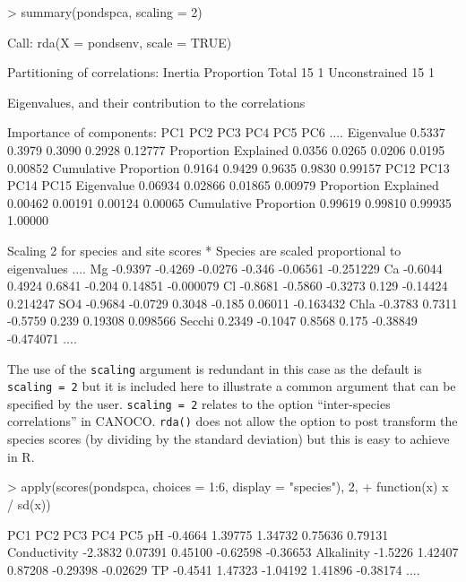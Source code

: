 \documentclass[a4paper,10pt]{article}
\newcommand{\rda}{\texttt{rda()}\xspace}
\newcommand{\R}{\textsf{R}\xspace}
\begin{document}
\begin{Schunk}
\begin{Sinput}
> summary(pondspca, scaling = 2)
\end{Sinput}
\end{Schunk}
\begin{Schunk}
\begin{Soutput}
Call:
rda(X = pondsenv, scale = TRUE) 

Partitioning of correlations:
              Inertia Proportion
Total              15          1
Unconstrained      15          1

Eigenvalues, and their contribution to the correlations 

Importance of components:
                        PC1   PC2   PC3    PC4    PC5    PC6
....
Eigenvalue            0.5337 0.3979 0.3090 0.2928 0.12777
Proportion Explained  0.0356 0.0265 0.0206 0.0195 0.00852
Cumulative Proportion 0.9164 0.9429 0.9635 0.9830 0.99157
                         PC12    PC13    PC14    PC15
Eigenvalue            0.06934 0.02866 0.01865 0.00979
Proportion Explained  0.00462 0.00191 0.00124 0.00065
Cumulative Proportion 0.99619 0.99810 0.99935 1.00000

Scaling 2 for species and site scores
* Species are scaled proportional to eigenvalues
....
Mg           -0.9397 -0.4269 -0.0276 -0.346 -0.06561 -0.251229
Ca           -0.6044  0.4924  0.6841 -0.204  0.14851 -0.000079
Cl           -0.8681 -0.5860 -0.3273  0.129 -0.14424  0.214247
SO4          -0.9684 -0.0729  0.3048 -0.185  0.06011 -0.163432
Chla         -0.3783  0.7311 -0.5759  0.239  0.19308  0.098566
Secchi        0.2349 -0.1047  0.8568  0.175 -0.38849 -0.474071
....
\end{Soutput}
\end{Schunk}
The use of the \texttt{scaling} argument is redundant in this case as the default is \texttt{scaling = 2} but it is included here to illustrate a common argument that can be specified by the user. \texttt{scaling = 2} relates to the option ``inter-species correlations'' in CANOCO. \rda does not allow the option to post transform the species scores (by dividing by the standard deviation) but this is easy to achieve in \R.

\begin{Schunk}
\begin{Sinput}
> apply(scores(pondspca, choices = 1:6, display = "species"), 2,
+       function(x) x / sd(x))
\end{Sinput}
\end{Schunk}
\begin{Schunk}
\begin{Soutput}
                 PC1      PC2      PC3      PC4      PC5
pH           -0.4664  1.39775  1.34732  0.75636  0.79131
Conductivity -2.3832  0.07391  0.45100 -0.62598 -0.36653
Alkalinity   -1.5226  1.42407  0.87208 -0.29398 -0.02629
TP           -0.4541  1.47323 -1.04192  1.41896 -0.38174
....
\end{Soutput}
\end{Schunk}
\end{document}
